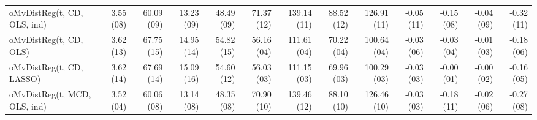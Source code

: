 \begin{tabular}{lrrrrrrrrrrrr}
oMvDistReg(t, CD, OLS, ind) & {\cellcolor[HTML]{D9C5C5}} \color[HTML]{000000} 3.55 (08) & {\cellcolor[HTML]{D38E8E}} \color[HTML]{F1F1F1} 60.09 (09) & {\cellcolor[HTML]{D8B6B6}} \color[HTML]{000000} 13.23 (09) & {\cellcolor[HTML]{D38F8F}} \color[HTML]{F1F1F1} 48.49 (09) & {\cellcolor[HTML]{D7ADAD}} \color[HTML]{000000} 71.37 (12) & {\cellcolor[HTML]{DBD1D1}} \color[HTML]{000000} 139.14 (11) & {\cellcolor[HTML]{D7B1B1}} \color[HTML]{000000} 88.52 (12) & {\cellcolor[HTML]{DBD2D2}} \color[HTML]{000000} 126.91 (11) & {\cellcolor[HTML]{6EAEAE}} \color[HTML]{F1F1F1} -0.05 (11) & {\cellcolor[HTML]{D7AFAF}} \color[HTML]{000000} -0.15 (08) & {\cellcolor[HTML]{D9C5C5}} \color[HTML]{000000} -0.04 (09) & {\cellcolor[HTML]{DBD3D3}} \color[HTML]{000000} -0.32 (11) \\
oMvDistReg(t, CD, OLS) & {\cellcolor[HTML]{D28989}} \color[HTML]{F1F1F1} 3.62 (13) & {\cellcolor[HTML]{CD6060}} \color[HTML]{F1F1F1} 67.75 (15) & {\cellcolor[HTML]{CE6262}} \color[HTML]{F1F1F1} 14.95 (14) & {\cellcolor[HTML]{CE6363}} \color[HTML]{F1F1F1} 54.82 (15) & {\cellcolor[HTML]{118787}} \color[HTML]{F1F1F1} 56.16 (04) & {\cellcolor[HTML]{0C8585}} \color[HTML]{F1F1F1} 111.61 (04) & {\cellcolor[HTML]{118787}} \color[HTML]{F1F1F1} 70.22 (04) & {\cellcolor[HTML]{108686}} \color[HTML]{F1F1F1} 100.64 (04) & {\cellcolor[HTML]{379797}} \color[HTML]{F1F1F1} -0.03 (06) & {\cellcolor[HTML]{A6C5C5}} \color[HTML]{000000} -0.03 (04) & {\cellcolor[HTML]{9AC0C0}} \color[HTML]{000000} -0.01 (03) & {\cellcolor[HTML]{72B0B0}} \color[HTML]{F1F1F1} -0.18 (06) \\
oMvDistReg(t, CD, LASSO) & {\cellcolor[HTML]{D28989}} \color[HTML]{F1F1F1} 3.62 (14) & {\cellcolor[HTML]{CE6161}} \color[HTML]{F1F1F1} 67.69 (14) & {\cellcolor[HTML]{CD5C5C}} \color[HTML]{F1F1F1} 15.09 (16) & {\cellcolor[HTML]{CE6565}} \color[HTML]{F1F1F1} 54.60 (12) & {\cellcolor[HTML]{0E8686}} \color[HTML]{F1F1F1} 56.03 (03) & {\cellcolor[HTML]{078383}} \color[HTML]{F1F1F1} 111.15 (03) & {\cellcolor[HTML]{0C8585}} \color[HTML]{F1F1F1} 69.96 (03) & {\cellcolor[HTML]{0E8686}} \color[HTML]{F1F1F1} 100.29 (03) & {\cellcolor[HTML]{1D8C8C}} \color[HTML]{F1F1F1} -0.03 (03) & {\cellcolor[HTML]{008080}} \color[HTML]{F1F1F1} -0.00 (01) & {\cellcolor[HTML]{61A8A8}} \color[HTML]{F1F1F1} -0.00 (02) & {\cellcolor[HTML]{5FA8A8}} \color[HTML]{F1F1F1} -0.16 (05) \\
oMvDistReg(t, MCD, OLS, ind) & {\cellcolor[HTML]{DBDCDC}} \color[HTML]{000000} 3.52 (04) & {\cellcolor[HTML]{D38E8E}} \color[HTML]{F1F1F1} 60.06 (08) & {\cellcolor[HTML]{D8BBBB}} \color[HTML]{000000} 13.14 (08) & {\cellcolor[HTML]{D39090}} \color[HTML]{F1F1F1} 48.35 (08) & {\cellcolor[HTML]{D7B2B2}} \color[HTML]{000000} 70.90 (10) & {\cellcolor[HTML]{DBD0D0}} \color[HTML]{000000} 139.46 (12) & {\cellcolor[HTML]{D7B4B4}} \color[HTML]{000000} 88.10 (10) & {\cellcolor[HTML]{DBD4D4}} \color[HTML]{000000} 126.46 (10) & {\cellcolor[HTML]{1D8C8C}} \color[HTML]{F1F1F1} -0.03 (03) & {\cellcolor[HTML]{D5A4A4}} \color[HTML]{000000} -0.18 (11) & {\cellcolor[HTML]{CFD7D7}} \color[HTML]{000000} -0.02 (06) & {\cellcolor[HTML]{C8D4D4}} \color[HTML]{000000} -0.27 (08) \\

\end{tabular}
